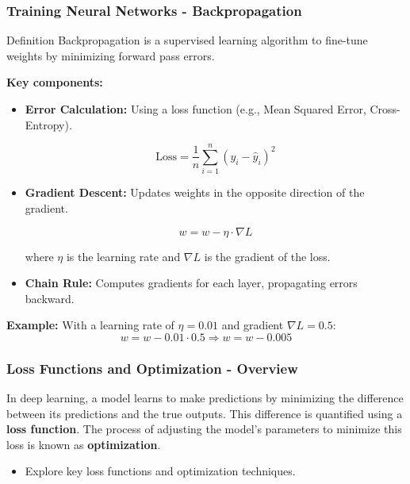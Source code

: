 \documentclass[aspectratio=169]{beamer}
\begin{document}
\begin{frame}[fragile]
    \frametitle{Training Neural Networks - Backpropagation}

    \begin{block}{Definition}
        Backpropagation is a supervised learning algorithm to fine-tune weights by minimizing forward pass errors.
    \end{block}

    \textbf{Key components:}
    \begin{itemize}
        \item \textbf{Error Calculation:} Using a loss function (e.g., Mean Squared Error, Cross-Entropy).
        
        \begin{equation}
            \text{Loss} = \frac{1}{n} \sum_{i=1}^{n} (y_i - \hat{y}_i)^2
        \end{equation}
        
        \item \textbf{Gradient Descent:} Updates weights in the opposite direction of the gradient.
        
        \begin{equation}
            w = w - \eta \cdot \nabla L
        \end{equation}
        
        where \(\eta\) is the learning rate and \(\nabla L\) is the gradient of the loss.
        
        \item \textbf{Chain Rule:} Computes gradients for each layer, propagating errors backward.
    \end{itemize}

    \textbf{Example:} With a learning rate of \(\eta = 0.01\) and gradient \(\nabla L = 0.5\):
    \begin{equation}
        w = w - 0.01 \cdot 0.5 \Rightarrow w = w - 0.005
    \end{equation}
\end{frame}

\begin{frame}[fragile]
    \frametitle{Loss Functions and Optimization - Overview}
    In deep learning, a model learns to make predictions by minimizing the difference between its predictions and the true outputs. This difference is quantified using a \textbf{loss function}. The process of adjusting the model's parameters to minimize this loss is known as \textbf{optimization}. 
    \begin{itemize}
        \item Explore key loss functions and optimization techniques.
    \end{itemize}
\end{frame}
\end{document}
